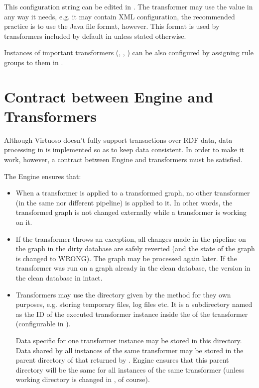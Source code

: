 This configuration string can be edited in \FE. The transformer may use the value in any way it needs, e.g. it may contain XML configuration, the recommended practice is to use the Java  file format, however. This format is used by transformers included by default in \odcs unless stated otherwise.

Instances of important transformers (\QA, \DN, \OI) can be also configured by assigning rule groups to them in \FE.

\section{Contract between Engine and Transformers}
\label{sec:transformerContract}
Although Virtuoso doesn't fully support transactions over RDF data, data processing in \odcs is implemented so as to keep data consistent. In order to make it work, however, a contract between Engine and transformers must be satisfied.

The Engine ensures that:

\begin{itemize}
	\item When a transformer is applied to a transformed graph, no other transformer (in the same nor different pipeline) is applied to it. In other words, the transformed graph is not changed externally while a transformer is working on it.
	\item If the transformer throws an exception, all changes made in the pipeline on the graph in the dirty database are safely reverted (and the state of the graph is changed to WRONG). The graph may be processed again later. If the transformer was run on a graph already in the clean database, the version in the clean database in intact.
	\item Transformers may use the directory given by the  method for they own purposes, e.g. storing temporary files, log files etc. It is a subdirectory named as the ID of the executed transformer instance inside the  of the transformer (configurable in \FE).

		Data specific for one transformer instance may be stored in this directory. Data shared by all instances of the same transformer may be stored in the parent directory of that returned by . Engine ensures that this parent directory will be the same for all instances of the same transformer (unless working directory is changed in \FE, of course).
\end{itemize}

